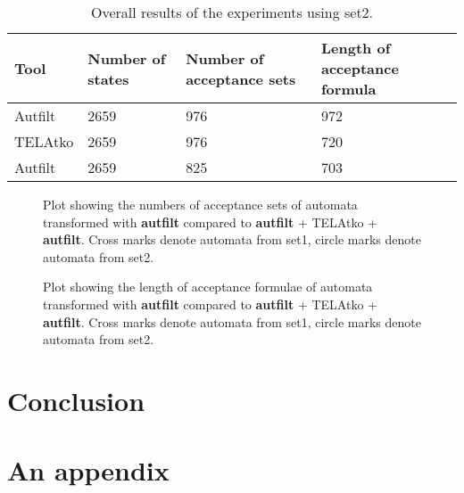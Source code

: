 \documentclass[
  digital, %
  twoside, %
  table,   %
  lof,     %
  lot,     %
]{fithesis3}
\begin{document}
\begin{table}[h]
  \begin{tabularx}{\textwidth}{lXXX}
    \toprule
    Tool & Number of states & Number of acceptance sets & Length of acceptance formula  \\
    \midrule
    Autfilt & 2659 & 976 & 972 \\
    TELAtko & 2659 & 976 & 720 \\
    Autfilt & 2659 & 825 & 703 \\    
    \bottomrule
  \end{tabularx}
  \caption{Overall results of the experiments using set2.}
  \label{tab:ltl3tela}
\end{table}

\begin{figure}[h]
  \centering
    \begin{tikzpicture}
      
    \end{tikzpicture}
  \caption{Plot showing the numbers of acceptance sets of automata transformed with \textbf{autfilt} compared to \textbf{autfilt} + TELAtko + \textbf{autfilt}. Cross marks denote automata from set1, circle marks denote automata from set2.}
  \label{fig:scplot_marks}
\end{figure}

\begin{figure}[h]
  \centering
    \begin{tikzpicture}
      
    \end{tikzpicture}
  \caption{Plot showing the length of acceptance formulae of automata transformed with \textbf{autfilt} compared to \textbf{autfilt} + TELAtko + \textbf{autfilt}. Cross marks denote automata from set1, circle marks denote automata from set2.}
  \label{fig:scplot_formula_len}
\end{figure}

\chapter{Conclusion}

\printbibliography[heading=bibintoc]

\makeatletter\thesis@blocks@clear\makeatother
{}
{} 
\printindex

\appendix
\chapter{An appendix}
\end{document}
